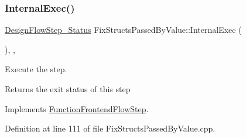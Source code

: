 \mbox{\label{classFixStructsPassedByValue_a30d76d47407cac74933b87bca8bb4292}} 
\subsubsection{\texorpdfstring{Internal\+Exec()}{InternalExec()}}
{\footnotesize\ttfamily \hyperlink{design__flow__step_8hpp_afb1f0d73069c26076b8d31dbc8ebecdf}{Design\+Flow\+Step\+\_\+\+Status} Fix\+Structs\+Passed\+By\+Value\+::\+Internal\+Exec (\begin{DoxyParamCaption}{ }\end{DoxyParamCaption})\hspace{0.3cm}{\ttfamily [override]}, {\ttfamily [protected]}, {\ttfamily [virtual]}}



Execute the step. 

\begin{DoxyReturn}{Returns}
the exit status of this step 
\end{DoxyReturn}


Implements \hyperlink{classFunctionFrontendFlowStep_a00612f7fb9eabbbc8ee7e39d34e5ac68}{Function\+Frontend\+Flow\+Step}.



Definition at line 111 of file Fix\+Structs\+Passed\+By\+Value.\+cpp.



